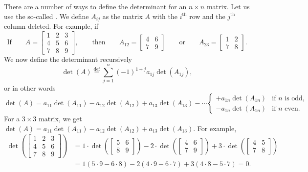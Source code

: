 There are a number of ways to define the determinant for an $n \times n$
matrix.  Let us use the so-called \emph{}.
We define $A_{ij}$ as
the matrix $A$ with the $i^{\text{th}}$ row and the $j^{\text{th}}$ column
deleted.  For example, if
\begin{equation*}
\text{If} \qquad
A = 
\begin{bmatrix}
1 & 2 & 3 \\
4 & 5 & 6 \\
7 & 8 & 9
\end{bmatrix} ,
\qquad
\text{then}
\qquad
A_{12} = 
\begin{bmatrix}
4 & 6 \\
7 & 9
\end{bmatrix}
\qquad
\text{or}
\qquad
A_{23} = 
\begin{bmatrix}
1 & 2 \\
7 & 8
\end{bmatrix} .
\end{equation*}
We now define the determinant recursively
\begin{equation*}
\det (A)
\overset{\text{def}}{=}
\sum_{j=1}^n
{(-1)}^{1+j}
a_{1j} \det (A_{1j}) ,
\end{equation*}
or in other words
\begin{equation*}
\det (A) =
a_{11} \det (A_{11}) - 
a_{12} \det (A_{12}) + 
a_{13} \det (A_{13}) - 
\cdots
\begin{cases}
+ a_{1n} \det (A_{1n}) & \text{if } n \text{ is odd,} \\
- a_{1n} \det (A_{1n}) & \text{if } n \text{ even.}
\end{cases}
\end{equation*}
For a $3 \times 3$ matrix,
we get $\det (A) = a_{11} \det (A_{11}) -
a_{12} \det (A_{12}) + a_{13} \det (A_{13})$.  For example,
\begin{equation*}
\begin{split}
\det \left(
\begin{bmatrix}
1 & 2 & 3 \\
4 & 5 & 6 \\
7 & 8 & 9
\end{bmatrix}
\right)
& =
1 \cdot
\det \left(
\begin{bmatrix}
5 & 6 \\
8 & 9
\end{bmatrix}
\right)
-
2 \cdot
\det \left(
\begin{bmatrix}
4 & 6 \\
7 & 9
\end{bmatrix}
\right)
+
3 \cdot
\det \left(
\begin{bmatrix}
4 & 5 \\
7 & 8
\end{bmatrix}
\right) \\
& =
1 (5 \cdot 9 - 6 \cdot 8)
-
2 (4 \cdot 9 - 6 \cdot 7)
+
3 (4 \cdot 8 - 5 \cdot 7)
= 0 .
\end{split}
\end{equation*}


